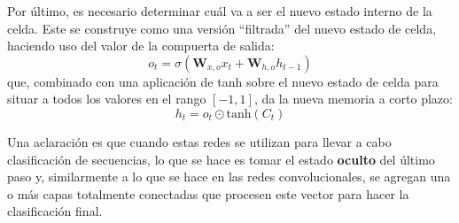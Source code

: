 \documentclass[../../main.tex]{subfiles}
\begin{document}
Por último, es necesario determinar cuál va a ser el nuevo estado interno de la celda.
Este se construye como una versión ``filtrada'' del nuevo estado de celda, haciendo
uso del valor de la compuerta de salida:
\[
    o_t = \sigma \left( \bm{W}_{x,o} x_t + \bm{W}_{h,o} h_{t-1} \right)
\]
que, combinado con una aplicación de tanh sobre el nuevo estado de celda para situar a
todos los valores en el rango \([-1,1]\), da la nueva memoria a corto plazo:
\[
    h_t = o_t \odot \text{tanh}(C_t)
\]

\bigskip
Una aclaración es que cuando estas redes se utilizan para llevar a cabo clasificación
de secuencias, lo que se hace es tomar el estado \textbf{oculto} del último paso y,
similarmente a lo que se hace en las redes convolucionales, se agregan una o más capas
totalmente conectadas que procesen este vector para hacer la clasificación final.
\end{document}
